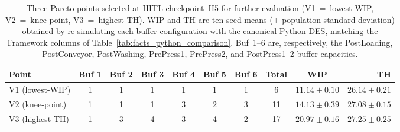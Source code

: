 \documentclass[a4paper,fleqn]{cas-sc}
\begin{document}
  \begin{table}[]                                                                                               
  \centering
  \caption{Three Pareto points selected at HITL checkpoint~H5 for further                                           
  evaluation (V1~=~lowest-WIP, V2~=~knee-point, V3~=~highest-TH). WIP and                                           
  TH are ten-seed means ($\pm$ population standard deviation) obtained by                                           
  re-simulating each buffer configuration with the canonical Python DES,                                            
  matching the Framework columns of                                                                                 
  Table~\ref{tab:facts_python_comparison}. Buf~1--6 are, respectively, the                                          
  PostLoading, PostConveyor, PostWashing, PrePress1, PrePress2, and                                                 
  PostPress1--2 buffer capacities.}                                                        
  \label{tab:suggestions}                                                                                           
  \begin{tabular}{@{}l c c c c c c c c r@{}}                                                                        
  \toprule                                                                                                          
  \textbf{Point} & \textbf{Buf 1} & \textbf{Buf 2} & \textbf{Buf 3} &                                               
  \textbf{Buf 4} & \textbf{Buf 5} & \textbf{Buf 6} & \textbf{Total} &                                               
  \textbf{WIP} & \textbf{TH} \\                                                                                     
  \midrule                                                                                                          
  V1 (lowest-WIP)  & 1 & 1 & 1 & 1 & 1 & 1 & 6  & $11.14 \pm 0.10$ & $26.14 \pm 0.21$ \\                            
  V2 (knee-point)  & 1 & 1 & 1 & 3 & 2 & 3 & 11 & $14.13 \pm 0.39$ & $27.08 \pm 0.15$ \\                            
  V3 (highest-TH)  & 1 & 3 & 4 & 3 & 4 & 2 & 17 & $20.97 \pm 0.16$ & $27.25 \pm 0.25$ \\                            
  \bottomrule                                                                                                       
  \end{tabular}                                                                                                     
  \end{table}                                                                                                       
                                                                                                                    
\end{document}
